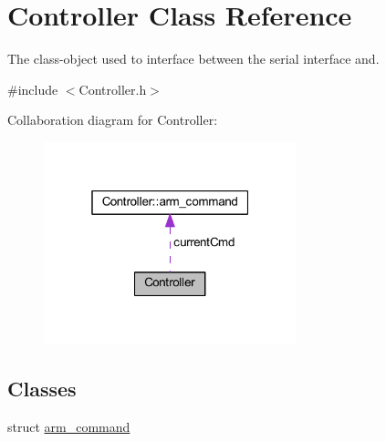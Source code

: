 \hypertarget{class_controller}{}\section{Controller Class Reference}
\label{class_controller}


The class-\/object used to interface between the serial interface and.  




{\ttfamily \#include $<$Controller.\+h$>$}



Collaboration diagram for Controller\+:\nopagebreak
\begin{figure}[H]
\begin{center}
\leavevmode
\includegraphics[width=208pt]{class_controller__coll__graph}
\end{center}
\end{figure}
\subsection*{Classes}
\begin{DoxyCompactItemize}
\item 
struct \hyperlink{struct_controller_1_1arm__command}{arm\+\_\+command}
\end{DoxyCompactItemize}
